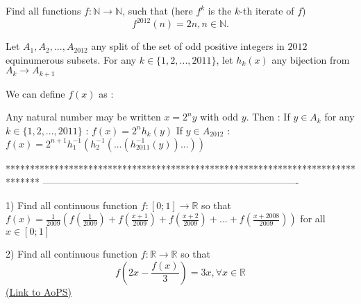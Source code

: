 \begin{solution}
	\begin{tcolorbox}Find all functions  $f: \mathbb{N} \to \mathbb{N}$, such that (here $f^k$ is the $k$-th iterate of $f$)
\[ f^{2012}(n)=2n,    n\in \mathbb{N}.  \]\end{tcolorbox}
Let $A_1,A_2,...,A_{2012}$ any split of the set of odd positive integers in $2012$ equinumerous subsets.
For any $k\in\{1,2,...,2011\}$, let $h_k(x)$ any bijection from $A_k\to A_{k+1}$

We can define $f(x)$ as :

Any natural number may be written $x=2^ny$ with odd $y$. Then :
If $y\in A_k$ for any $k\in\{1,2,...,2011\}$ : $f(x)=2^nh_k(y)$
If $y\in A_{2012}$ : $f(x)=2^{n+1}h_{1}^{-1}(h_2^{-1}(...(h_{2011}^{-1}(y))...))$
\end{solution}
*******************************************************************************
-------------------------------------------------------------------------------

\begin{problem}
	1) Find all continuous function $f:[0;1]\to\mathbb{R}$ so that 
$f(x)=\frac{1}{2009}\left(f(\frac{1}{2009})+f(\frac{x+1}{2009})+f(\frac{x+2}{2009})+...+f(\frac{x+2008}{2009})\right) $  for all $x\in [0;1]$

2) Find all continuous function $f:\mathbb{R}\to\mathbb{R}$ so that \[f(2x-\frac{f(x)}{3})=3x,\forall x\in\mathbb{R}\]
	\flushright \href{https://artofproblemsolving.com/community/c6h535045}{(Link to AoPS)}
\end{problem}



